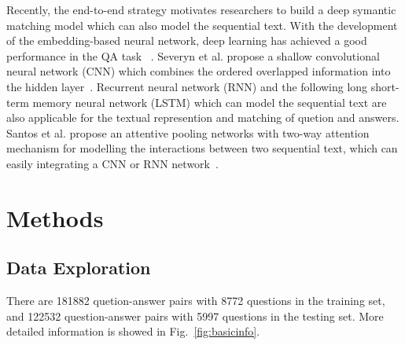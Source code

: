 \documentclass{llncs}
\begin{document}
Recently, the end-to-end strategy motivates researchers to build a deep symantic matching model which can also model the sequential text. With the development of the embedding-based neural network, deep learning has achieved a good performance in the QA task~ \cite{Yu2014Deep}\cite{Feng2015Applying}. Severyn et al. propose a shallow convolutional neural network (CNN) which combines the ordered overlapped information into the hidden layer~\cite{severyn2015learning}. Recurrent neural network (RNN) and the following long short-term memory neural network (LSTM) \cite{Wang2015A}\cite{Tan2015LSTM} which can model the sequential text are also applicable for the textual represention and matching of quetion and answers. Santos et al. propose an attentive pooling networks with two-way attention mechanism for modelling the interactions between two sequential text, which can easily integrating a CNN or RNN network~\cite{Santos2016Attentive}. 



\section{Methods}
\label{sec:methods}

\subsection{Data Exploration}
\label{sec:exploration}

There are 181882 quetion-answer pairs with 8772 questions in the training set, and 122532 question-answer pairs with 5997 questions in the testing set. More detailed information is showed in  Fig.~\ref{fig:basicinfo}.
\end{document}
